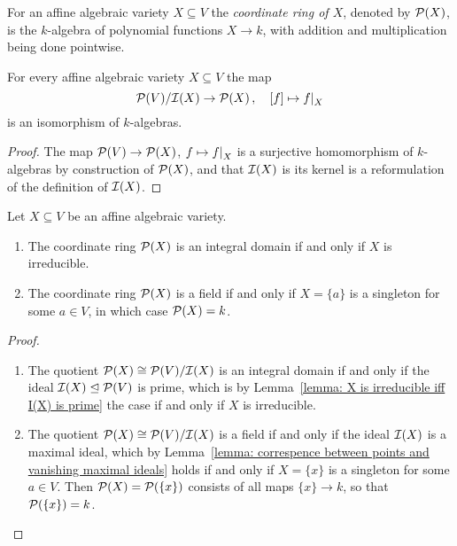 \begin{definition}
  For an affine algebraic variety $X \subseteq V$ the \emph{coordinate ring of $X$}, denoted by $\mathcal{P}(X)$, is the $k$-algebra of polynomial functions $X \to k$, with addition and multiplication being done pointwise.
\end{definition}


\begin{lemma}
  \label{lemma: coordinate ring as quotient}
  For every affine algebraic variety $X \subseteq V$ the map
  \[
            \mc{P}(V)/\mc{I}(X)
    \to     \mc{P}(X) \,,
    \quad   [f]
    \mapsto \restrict{f}{X}
  \]
  is an isomorphism of $k$-algebras.
\end{lemma}


\begin{proof}
  The map $\mathcal{P}(V) \to \mathcal{P}(X)$, $f \mapsto \restrict{f}{X}$ is a surjective homomorphism of $k$-algebras by construction of $\mathcal{P}(X)$, and that $\mathcal{I}(X)$ is its kernel is a reformulation of the definition of $\mathcal{I}(X)$.
\end{proof}


\begin{corollary}
  Let $X \subseteq V$ be an affine algebraic variety.
  \begin{enumerate}
    \item
      The coordinate ring $\mathcal{P}(X)$ is an integral domain if and only if $X$ is irreducible.
    \item
      The coordinate ring $\mathcal{P}(X)$ is a field if and only if $X = \{a\}$ is a singleton for some $a \in V$, in which case $\mathcal{P}(X) = k$.
  \end{enumerate}
\end{corollary}


\begin{proof}
  \leavevmode
  \begin{enumerate}
    \item
      The quotient $\mathcal{P}(X) \cong \mathcal{P}(V)/\mathcal{I}(X)$ is an integral domain if and only if the ideal $\mathcal{I}(X) \trianglelefteq \mathcal{P}(V)$ is prime, which is by Lemma~\ref{lemma: X is irreducible iff I(X) is prime} the case if and only if $X$ is irreducible.
    \item
      The quotient $\mathcal{P}(X) \cong \mathcal{P}(V)/\mathcal{I}(X)$ is a field if and only if the ideal $\mathcal{I}(X)$ is a maximal ideal, which by Lemma~\ref{lemma: correspence between points and vanishing maximal ideals} holds if and only if $X = \{x\}$ is a singleton for some $a \in V$.
      Then $\mathcal{P}(X) = \mathcal{P}(\{x\})$ consists of all maps $\{x\} \to k$, so that $\mathcal{P}(\{x\}) = k$.
    \qedhere
  \end{enumerate}
\end{proof}


